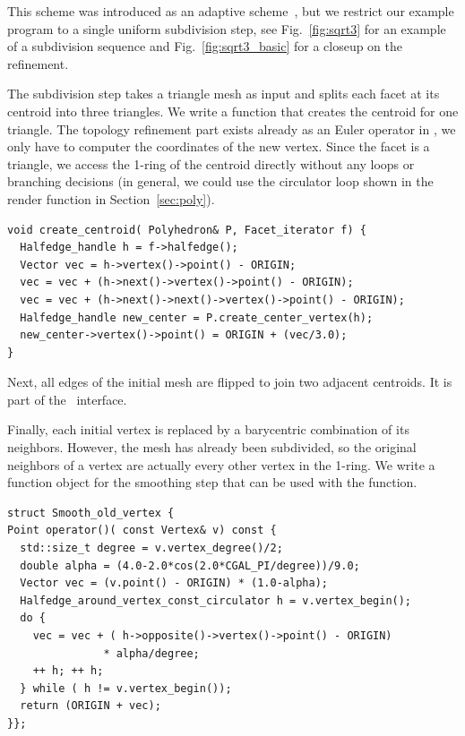 \label{sec:sqrt3}

This scheme was introduced as an adaptive scheme~\cite{sqrt3}, but we
restrict our example program to a single uniform subdivision step, see
Fig.~\ref{fig:sqrt3} for an example of a subdivision sequence and
Fig.~\ref{fig:sqrt3_basic} for a closeup on the refinement.

The subdivision step takes a triangle mesh as input and splits each
facet at its centroid into three triangles.  We write a function that
creates the centroid for one triangle. The topology refinement part
exists already as an Euler operator in \cgalpoly, we only have to
computer the coordinates of the new vertex. Since the facet is a
triangle, we access the 1-ring of the centroid directly without any
loops or branching decisions (in general, we could use the circulator
loop shown in the render function in Section~\ref{sec:poly}).
%
\begin{lstlisting}
void create_centroid( Polyhedron& P, Facet_iterator f) {
  Halfedge_handle h = f->halfedge();
  Vector vec = h->vertex()->point() - ORIGIN;
  vec = vec + (h->next()->vertex()->point() - ORIGIN);
  vec = vec + (h->next()->next()->vertex()->point() - ORIGIN);
  Halfedge_handle new_center = P.create_center_vertex(h);
  new_center->vertex()->point() = ORIGIN + (vec/3.0);
}
\end{lstlisting}\vspace*{-3mm}

\noindent
Next, all edges of the initial mesh are flipped to join two
adjacent centroids. It is part of the \cgalpoly\ interface.

Finally, each initial vertex is replaced by a barycentric combination
of its neighbors. However, the mesh has already been subdivided, so
the original neighbors of a vertex are actually every other vertex in
the 1-ring. We write a function object for the smoothing step that
can be used with the  function.

\begin{lstlisting}
struct Smooth_old_vertex {
Point operator()( const Vertex& v) const {
  std::size_t degree = v.vertex_degree()/2;
  double alpha = (4.0-2.0*cos(2.0*CGAL_PI/degree))/9.0;
  Vector vec = (v.point() - ORIGIN) * (1.0-alpha);
  Halfedge_around_vertex_const_circulator h = v.vertex_begin();
  do {
    vec = vec + ( h->opposite()->vertex()->point() - ORIGIN) 
               * alpha/degree;
    ++ h; ++ h;
  } while ( h != v.vertex_begin());
  return (ORIGIN + vec);
}};
\end{lstlisting}\vspace*{-3mm}

